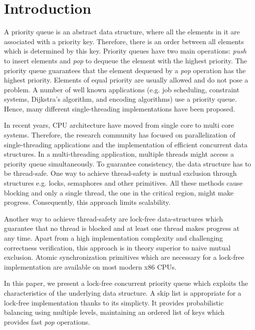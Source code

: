 \section{Introduction}\label{sec:intro}

A priority queue is an abstract data structure, where all the elements in it are associated with a priority key.
Therefore, there is an order between all elements which is determined by this key. %
Priority queues have two main operations: \textit{push} to insert elements and \textit{pop} to dequeue the element with the highest priority.
The priority queue guarantees that the element dequeued by a \textit{pop} operation has the highest priority.
Elements of equal priority are usually allowed and do not pose a problem.
A number of well known applications (e.g. job scheduling, constraint systems, Dijkstra's algorithm, and encoding algorithms) use a priority queue.
Hence, many different single-threading implementations have been proposed.

In recent years, CPU architecture have moved from single core to multi core systems.
Therefore, the research community has focused on parallelization of single-threading applications and the implementation of efficient concurrent data structures.
In a multi-threading application, multiple threads might access a priority queue simultaneously.
To guarantee consistency, the data structure has to be thread-safe.
One way to achieve thread-safety is mutual exclusion through structures e.g. locks, semaphores and other primitives.
All these methods cause blocking and only a single thread, the one in the critical region, might make progress.
Consequently, this approach limits scalability.

Another way to achieve thread-safety are lock-free data-structures which guarantee that no thread is blocked and at least one thread makes progress at any time.
Apart from a high implementation complexity and challenging correctness verification, this approach is in theory superior to naive mutual exclusion.
Atomic synchronization primitives which are necessary for a lock-free implementation are available on most modern x86 CPUs.

In this paper, we present a lock-free concurrent priority queue which exploits the characteristics of the underlying data structure.
A skip list \cite{Pugh:1990:SLP:78973.78977} is appropriate for a lock-free implementation thanks to its simplicty.
It provides probabilistic balancing using multiple levels, maintaining an ordered list of keys which provides fast \textit{pop} operations.

